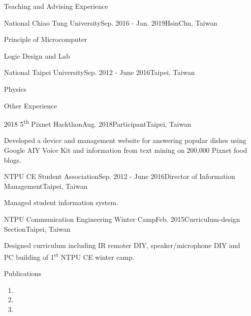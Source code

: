 \documentclass{resume} %
\newcommand{\ts}{\textsuperscript}
\begin{document}
\begin{rSection}{Teaching and Advising Experience}
    \begin{rSubsection}{National Chiao Tung University}{Sep. 2016 - Jan. 2019}{}{HsinChu, Taiwan}
        \item Principle of Microcomputer
        \item Logic Design and Lab
    \end{rSubsection}
    \begin{rSubsection}{National Taipei University}{Sep. 2012 - June 2016}{}{Taipei, Taiwan}
        \item Physics
    \end{rSubsection}
\end{rSection}

\begin{rSection}{Other Experience}
    \begin{rSubsection}{2018 5\ts{th} Pixnet Hackthon}{Aug. 2018}{Participant}{Taipei, Taiwan}
        \item Developed a device and management website for answering popular dishes using Google AIY Voice Kit and information from text mining on 200,000 Pixnet food blogs.
    \end{rSubsection}
    \begin{rSubsection}{NTPU CE Student Association}{Sep. 2012 - June 2016}{Director of Information Management}{Taipei, Taiwan}
        \item Managed student information system.
    \end{rSubsection}
    \begin{rSubsection}{NTPU Communication Engineering Winter Camp}{Feb. 2015}{Curriculum-design Section}{Taipei, Taiwan}
        \item Designed curriculum including IR remoter DIY, speaker/microphone DIY and PC building of 1\ts{st} NTPU CE winter camp.
    \end{rSubsection}
\end{rSection}

\begin{rSection}{Publications}



\begin{enumerate}
\item {}
\item {}
\item {}
\end{enumerate}


\end{rSection}
\end{document}
